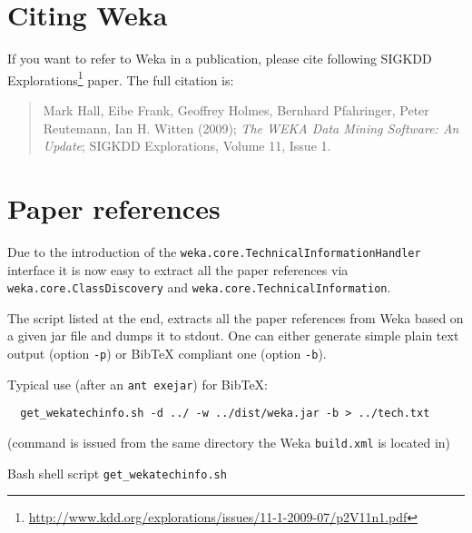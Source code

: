 %
%
%
%


\section{Citing Weka}
If you want to refer to Weka in a publication, please cite following SIGKDD
Explorations\footnote{\url{
http://www.kdd.org/explorations/issues/11-1-2009-07/p2V11n1.pdf}} paper. The
full citation is:

\begin{quote}
Mark Hall, Eibe Frank, Geoffrey Holmes, Bernhard Pfahringer, Peter Reutemann,
Ian H. Witten (2009); \textit{The WEKA Data Mining Software: An Update}; SIGKDD
Explorations, Volume 11, Issue 1. 
\end{quote}

\section{Paper references}
Due to the introduction of the \texttt{weka.core.TechnicalInformationHandler} interface it is now easy to extract all the paper references via \texttt{weka.core.ClassDiscovery} and \texttt{weka.core.TechnicalInformation}.

The script listed at the end, extracts all the paper references from Weka based on a given jar file and dumps it to stdout. One can either generate simple plain text output (option \texttt{-p}) or BibTeX compliant one (option \texttt{-b}).

Typical use (after an \texttt{ant exejar}) for BibTeX:

\begin{verbatim}
  get_wekatechinfo.sh -d ../ -w ../dist/weka.jar -b > ../tech.txt
\end{verbatim}

\noindent (command is issued from the same directory the Weka \texttt{build.xml} is located in)

\newpage
\noindent Bash shell script \texttt{get\_wekatechinfo.sh}
{\scriptsize

} 
